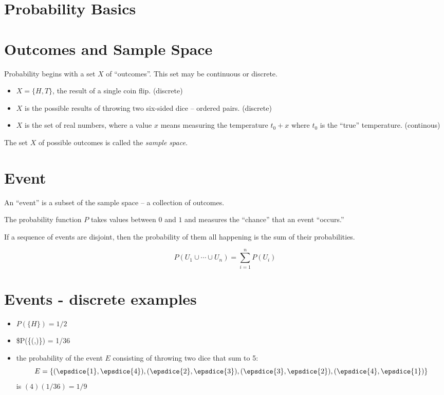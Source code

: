 \documentclass[
]{article}
\author{}
\date{}
\begin{document}
\hypertarget{probability-basics}{%
\section{Probability Basics}\label{probability-basics}}

\hypertarget{outcomes-and-sample-space}{%
\section{Outcomes and Sample Space}\label{outcomes-and-sample-space}}

Probability begins with a set \(X\) of ``outcomes''. This set may be
continuous or discrete.

\begin{itemize}
\item
  \(X=\{H,T\}\), the result of a single coin flip. (discrete)
\item
  \(X\) is the possible results of throwing two six-sided dice --
  ordered pairs. (discrete)
\item
  \(X\) is the set of real numbers, where a value \(x\) means measuring
  the temperature \(t_0+x\) where \(t_0\) is the ``true'' temperature.
  (continous)
\end{itemize}

The set \(X\) of possible outcomes is called the \emph{sample space.}

\hypertarget{event}{%
\section{Event}\label{event}}

An ``event'' is a subset of the sample space -- a collection of
outcomes.

The probability function \(P\) takes values between \(0\) and \(1\) and
measures the ``chance'' that an event ``occurs.''

If a sequence of events are disjoint, then the probability of them all
happening is the sum of their probabilities.

\[
P(U_1\cup\cdots\cup U_n)=\sum_{i=1}^{n} P(U_i)
\]

\hypertarget{events---discrete-examples}{%
\section{Events - discrete examples}\label{events---discrete-examples}}

\begin{itemize}
\item
  \(P(\{H\})=1/2\)
\item
  \$P(\{(,)\}) = 1/36
\item
  the probability of the event \(E\) consisting of throwing two dice
  that sum to 5: \[
  E=\{(\epsdice{1},\epsdice{4}),(\epsdice{2},\epsdice{3}),(\epsdice{3},\epsdice{2}),(\epsdice{4},\epsdice{1})\}
  \] is \((4)(1/36)=1/9\)
\end{itemize}
\end{document}
